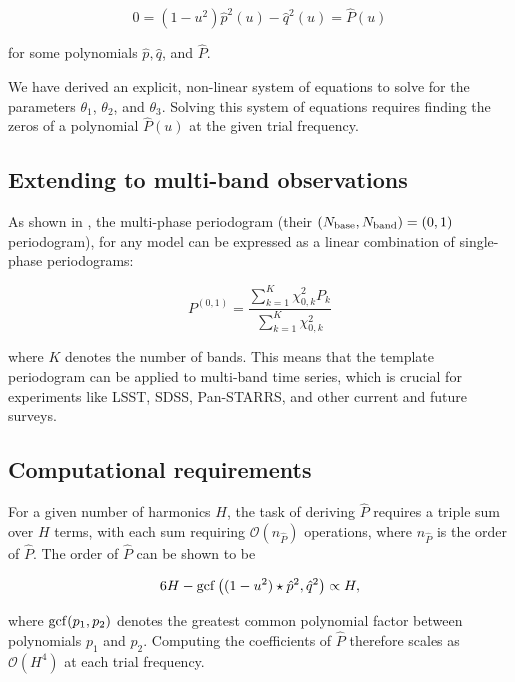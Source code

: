 \documentclass[iop]{emulateapj}
\newcommand{\bigO}{\mathcal{O}}
\begin{document}
\begin{equation}
0 = (1 - u^2)\hat{p}^2(u) - \hat{q}^2(u) = \hat{P}(u)
\end{equation}

\noindent for some polynomials $\hat{p}, \hat{q}$, and $\hat{P}$.


We have derived an explicit, non-linear system of equations to solve for
the parameters $\theta_1$, $\theta_2$, and $\theta_3$. Solving this system of equations
requires finding the zeros of a polynomial $\hat{P}(u)$ at the given trial frequency.

\subsection{Extending to multi-band observations}

As shown in \cite{Vanderplas+Ivezic_2015}, the multi-phase periodogram (their 
$(N_{\rm base}, N_{\rm band}) = (0, 1)$ periodogram), for any model can
be expressed as a linear combination of single-phase periodograms:

\begin{equation}
\label{eq:multiband}
P^{(0,1)} = \frac{\sum_{k=1}^K\chi^2_{0, k}P_{k}}{\sum_{k=1}^K\chi^2_{0,k}}
\end{equation} 

\noindent where $K$ denotes the number of bands. This means that the template
periodogram can be applied to multi-band time series, which is crucial for
experiments like LSST, SDSS, Pan-STARRS, and other current and future surveys.




\subsection{Computational requirements}

For a given number of harmonics $H$, the task of deriving 
$\hat{P}$ requires a triple sum over $H$ terms, with each sum
requiring $\bigO(n_{\hat{P}})$ operations, where $n_{\hat{P}}$ is the order
of $\hat{P}$. The order of $\hat{P}$ can be shown to be

\begin{equation}
6H - {\rm gcf}\left((1 - u^2)\star\hat{p}^2, \hat{q}^2\right) \propto H,
\end{equation}

\noindent where ${\rm gcf}(p_1, p_2)$ denotes the greatest common polynomial factor
between polynomials $p_1$ and $p_2$. Computing the coefficients of $\hat{P}$ therefore
scales as $\bigO(H^4)$ at each trial frequency. 
\end{document}

